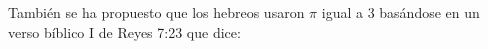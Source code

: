 \documentclass[preview]{standalone}
\begin{document}
\begin{center}
También se ha propuesto que los hebreos usaron $\pi$ igual a 3 basándose en un verso bíblico I de Reyes 7:23 que dice:
\end{center}
\end{document}
